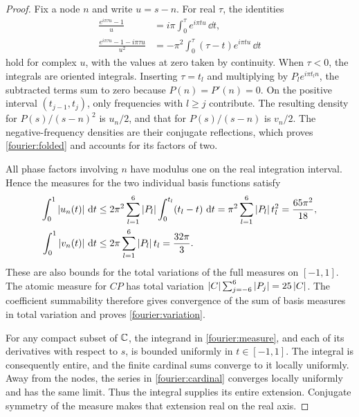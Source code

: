 \begin{proof}
Fix a node \(n\) and write \(u=s-n\).  For real \(\tau\), the identities
\begin{equation}\label{fourier:division-identities}
 \begin{split}
 \frac{e^{i\pi\tau u}-1}{u}
   &=i\pi\int_0^\tau e^{i\pi tu}\,\dd t,\\
 \frac{e^{i\pi\tau u}-1-i\pi\tau u}{u^2}
   &=-\pi^2\int_0^\tau(\tau-t)e^{i\pi tu}\,\dd t
 \end{split}
\end{equation}
hold for complex \(u\), with the values at zero taken by continuity.
When \(\tau<0\), the integrals are oriented integrals.  Inserting
\(\tau=t_l\) and multiplying by \(P_le^{i\pi t_ln}\), the subtracted
terms sum to zero because \(P(n)=P'(n)=0\).  On the positive interval
\((t_{j-1},t_j)\), only frequencies with \(l\ge j\) contribute.  The
resulting density for \(P(s)/(s-n)^2\) is \(u_n/2\), and that for
\(P(s)/(s-n)\) is \(v_n/2\).  The
negative-frequency densities are their conjugate reflections, which proves
\eqref{fourier:folded} and accounts for its factors of two.

All phase factors involving \(n\) have modulus one on the real integration
interval.  Hence the measures for the two individual basis functions satisfy
\[
 \begin{split}
 \int_0^1\left\lvert u_n(t)\right\rvert\,\mathop{}\!\mathrm d t
 &\le2\pi^2\sum_{l=1}^{6}\left\lvert P_l\right\rvert
                      \int_0^{t_l}(t_l-t)\,\mathop{}\!\mathrm d t
 =\pi^2\sum_{l=1}^{6}\left\lvert P_l\right\rvert t_l^2
 =\frac{65\pi^2}{18},\\
 \int_0^1\left\lvert v_n(t)\right\rvert\,\mathop{}\!\mathrm d t
 &\le2\pi\sum_{l=1}^{6}\left\lvert P_l\right\rvert t_l
 =\frac{32\pi}{3}.
 \end{split}
\]
These are also bounds for the total variations of the full measures on
\([-1,1]\).  The atomic measure for \(CP\) has total variation
\(\left\lvert C\right\rvert\sum_{j=-6}^{6}\left\lvert P_j\right\rvert=25\left\lvert C\right\rvert\).  The coefficient
summability therefore gives convergence of the sum of basis measures in
total variation and proves \eqref{fourier:variation}.

For any compact subset of \(\mathbb C\), the integrand in
\eqref{fourier:measure}, and each of its derivatives with respect to \(s\),
is bounded uniformly in \(t\in[-1,1]\).  The integral is consequently
entire, and the finite cardinal sums converge to it locally uniformly.
Away from the nodes, the series in \eqref{fourier:cardinal} converges
locally uniformly and has the same limit.  Thus the integral supplies its
entire extension.  Conjugate symmetry of the measure makes that extension
real on the real axis.
\end{proof}

